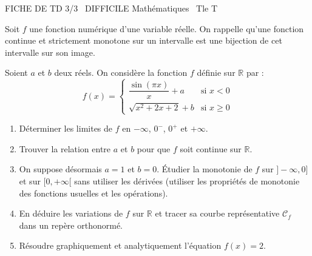 \documentclass[11pt]{article}
\begin{document}
\begin{tcolorbox}[enhanced,colback=popink,colframe=popink,arc=10pt,boxrule=0pt,left=12pt,right=12pt,top=9pt,bottom=9pt]
{\color{white}\popxbold\small FICHE DE TD 3/3 \textbullet\ DIFFICILE \hfill Mathématiques \textbullet\ Tle T\par}
\end{tcolorbox}
\vspace{4pt}
Soit $f$ une fonction numérique d'une variable réelle. On rappelle qu'une fonction continue et strictement monotone sur un intervalle est une bijection de cet intervalle sur son image.

\begin{exercice}
Soient $a$ et $b$ deux réels. On considère la fonction $f$ définie sur $\mathbb{R}$ par :
\[
f(x) = \begin{cases}
\dfrac{\sin(\pi x)}{x} + a & \text{si } x < 0 \\[1em]
\sqrt{x^2 + 2x + 2} + b & \text{si } x \ge 0
\end{cases}
\]
\begin{enumerate}
    \item Déterminer les limites de $f$ en $-\infty$, $0^-$, $0^+$ et $+\infty$.
    \item Trouver la relation entre $a$ et $b$ pour que $f$ soit continue sur $\mathbb{R}$.
    \item On suppose désormais $a = 1$ et $b = 0$. Étudier la monotonie de $f$ sur $]-\infty, 0]$ et sur $[0, +\infty[$ sans utiliser les dérivées (utiliser les propriétés de monotonie des fonctions usuelles et les opérations).
    \item En déduire les variations de $f$ sur $\mathbb{R}$ et tracer sa courbe représentative $\mathcal{C}_f$ dans un repère orthonormé.
    \item Résoudre graphiquement et analytiquement l'équation $f(x) = 2$.
\end{enumerate}
\end{exercice}
\end{document}
